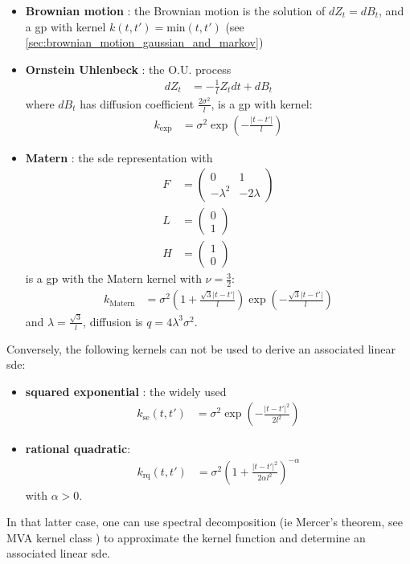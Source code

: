 \begin{itemize}
    \item \textbf{Brownian motion} : the Brownian motion is the solution of $dZ_t = dB_t$, 
    and a \gls{gp} with kernel $k(t,t') = \text{min}(t,t')$ (see \ref{sec:brownian_motion_gaussian_and_markov})
    \item \textbf{Ornstein Uhlenbeck} : the O.U. process
    \begin{align}
        dZ_t &= - \frac{1}{l} Z_t dt + dB_t
    \end{align}
    where $dB_t$ has diffusion coefficient $\frac{2 \sigma^{2}}{l}$, is a \gls{gp} with kernel:
    \begin{align}
        k_{\text{exp}} &= \sigma^{2} \exp{(- \frac{\vert t-t' \vert}{l})}
    \end{align}
    \item \textbf{Matern} : the \gls{sde} representation with
    \begin{align}
        F &= \begin{pmatrix}
            0 & 1 \\
            -\lambda^{2} & -2 \lambda 
        \end{pmatrix} \\
        L &= \begin{pmatrix}
            0 \\ 1
        \end{pmatrix} \\
        H &= \begin{pmatrix}
            1 \\ 0
        \end{pmatrix}
    \end{align}
    is a \gls{gp} with the Matern kernel with $\nu = \frac{3}{2}$:
    \begin{align}
        k_{\text{Matern}} &= \sigma^{2} \left(
            1 + \frac{\sqrt{3} \vert t-t' \vert}{l}
        \right) \exp{
            \left(
                -\frac{\sqrt{3} \vert t-t' \vert}{l}
            \right)
        }
    \end{align}
    and $\lambda = \frac{\sqrt{3}}{l}$, diffusion is $q = 4\lambda^{3}\sigma^{2}$.
\end{itemize}

Conversely, the following kernels can not be used to derive an associated linear \gls{sde}:

\begin{itemize}
    \item \textbf{squared exponential} : the widely used
    \begin{align}
        k_{\text{se}}(t,t') &= \sigma^{2} \exp{\left(
            - \frac{\vert t-t' \vert^{2}}{2l^{2}}
        \right)}
    \end{align}
    \item \textbf{rational quadratic}:
    \begin{align}
        k_{\text{rq}}(t,t') &= \sigma^{2} \left(
            1 + \frac{\vert t-t' \vert^{2}}{2 \alpha l^{2}}
        \right)^{-\alpha}
    \end{align}
    with $\alpha > 0$.
\end{itemize}

In that latter case, one can use spectral decomposition (ie Mercer's theorem, see MVA kernel class \cite{mva_kernel_class}) 
to approximate the kernel function and determine an associated linear \gls{sde}.